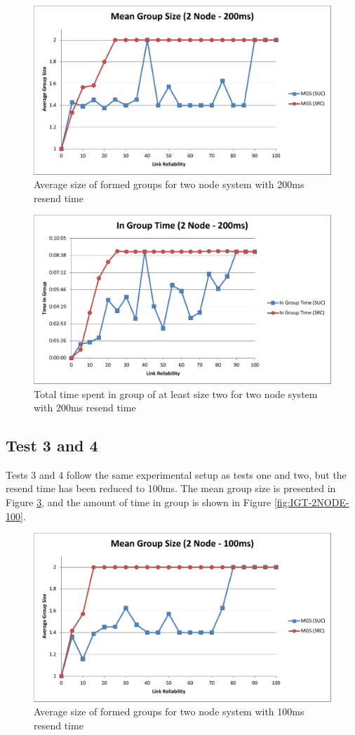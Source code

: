 \documentclass{llncs}
\begin{document}
\begin{figure}[!h]
\centering
\includegraphics[width=.74\textwidth]{MGS-2NODE-200.pdf}
\caption{Average size of formed groups for two node system with 200ms resend time}
\label{fig:MGS-2NODE-200}
\end{figure}

\begin{figure}[!h]
\centering
\includegraphics[width=.74\textwidth]{IGT-2NODE-200.pdf}
\caption{Total time spent in group of at least size two for two node system with 200ms resend time}
\label{fig:IGT-2NODE-200}
\end{figure}

\subsection{Test 3 and 4}

Tests 3 and 4 follow the same experimental setup as tests one and two, but the resend time has been reduced to 100ms.
The mean group size is presented in Figure \ref{fig:MGS-2NODE-100}, and the amount of time in group is shown in Figure \ref{fig:IGT-2NODE-100}.

\begin{figure}[!h]
\centering
\includegraphics[width=.74\textwidth]{MGS-2NODE-100.pdf}
\caption{Average size of formed groups for two node system with 100ms resend time}
\label{fig:MGS-2NODE-100}
\end{figure}
\end{document}
